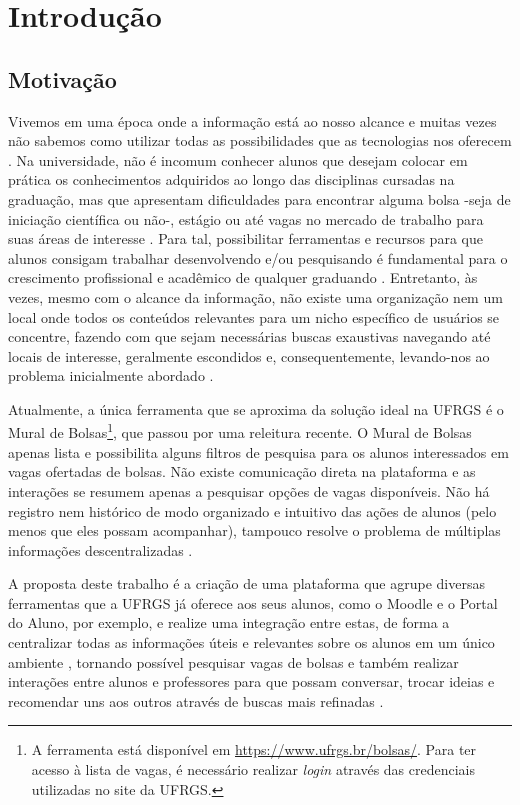 \chapter{Introdução}

\section{Motivação}
\label{introducaoMotivacao}

Vivemos em uma época onde a informação está ao nosso alcance e muitas vezes não sabemos como utilizar todas as possibilidades que as tecnologias nos oferecem \cite{anotherNodeArticle} \cite{impactInternetArticle}. Na universidade, não é incomum conhecer alunos que desejam colocar em prática os conhecimentos adquiridos ao longo das disciplinas cursadas na graduação, mas que apresentam dificuldades para encontrar alguma bolsa -seja de iniciação científica ou não-,
estágio ou até vagas no mercado de trabalho para suas áreas de interesse \cite{internetLibDesArticle}. Para tal, possibilitar ferramentas e recursos para que alunos consigam trabalhar desenvolvendo e/ou pesquisando é fundamental para o crescimento profissional e acadêmico de qualquer graduando \cite{teachMediaArticle}. Entretanto, às vezes, mesmo com o alcance da informação, não existe uma organização nem um local onde todos os conteúdos relevantes para um nicho específico de usuários se concentre, fazendo com que sejam necessárias buscas exaustivas navegando até locais de interesse, geralmente escondidos e, consequentemente, levando-nos ao problema inicialmente abordado \cite{socConnectArticle}.

Atualmente, a única ferramenta que se aproxima da solução ideal na UFRGS é o Mural de Bolsas\footnote{A ferramenta está disponível em \url{https://www.ufrgs.br/bolsas/}. Para ter acesso à lista de vagas, é necessário realizar \textit{login} através das credenciais utilizadas no site da UFRGS.}, que passou por uma releitura recente. O Mural de Bolsas apenas lista e possibilita alguns filtros de pesquisa para os alunos interessados em vagas ofertadas de bolsas. Não existe comunicação direta na plataforma e as interações se resumem apenas a pesquisar opções de vagas disponíveis. Não há registro nem histórico de modo organizado e intuitivo das ações de alunos (pelo menos que eles possam acompanhar), tampouco resolve o problema de múltiplas informações descentralizadas \cite{socialChallengeArticle}.

A proposta deste trabalho é a criação de uma plataforma que agrupe diversas ferramentas que a UFRGS já oferece aos seus alunos, como o Moodle e o Portal do Aluno, por exemplo, e realize uma integração entre estas, de forma a centralizar todas as informações úteis e relevantes sobre os alunos em um único ambiente \cite{socConnectArticle}, tornando possível pesquisar vagas de bolsas e também realizar interações entre alunos e professores para que possam conversar, trocar ideias e recomendar uns aos outros através de buscas mais refinadas \cite{UXLinkedinArticle} \cite{agileCareerArticle}. 

